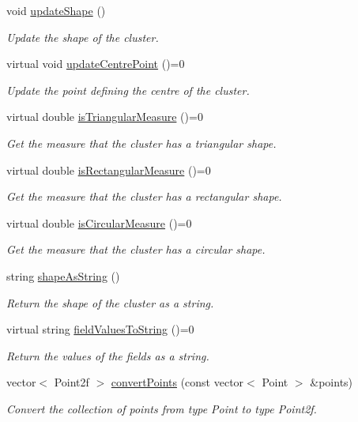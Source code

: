 \begin{DoxyCompactItemize}
void \hyperlink{classmultiscale_1_1analysis_1_1SpatialCollection2D_ab26bc346c1b0b0d17104c7d5cfb170bb}{update\-Shape} ()
\begin{DoxyCompactList}\small\item\em Update the shape of the cluster. \end{DoxyCompactList}\item 
virtual void \hyperlink{classmultiscale_1_1analysis_1_1SpatialCollection2D_aab860163169deb76a7e853df32902ab1}{update\-Centre\-Point} ()=0
\begin{DoxyCompactList}\small\item\em Update the point defining the centre of the cluster. \end{DoxyCompactList}\item 
virtual double \hyperlink{classmultiscale_1_1analysis_1_1SpatialCollection2D_acce0e9ddd2d92e3ba843c3015352cab5}{is\-Triangular\-Measure} ()=0
\begin{DoxyCompactList}\small\item\em Get the measure that the cluster has a triangular shape. \end{DoxyCompactList}\item 
virtual double \hyperlink{classmultiscale_1_1analysis_1_1SpatialCollection2D_a1acb28a7aafd1f75c23a94dbc988b038}{is\-Rectangular\-Measure} ()=0
\begin{DoxyCompactList}\small\item\em Get the measure that the cluster has a rectangular shape. \end{DoxyCompactList}\item 
virtual double \hyperlink{classmultiscale_1_1analysis_1_1SpatialCollection2D_a5d9967a9c531f3abe0236fbef1b0faba}{is\-Circular\-Measure} ()=0
\begin{DoxyCompactList}\small\item\em Get the measure that the cluster has a circular shape. \end{DoxyCompactList}\item 
string \hyperlink{classmultiscale_1_1analysis_1_1SpatialCollection2D_ac18243f267c777ab26bb836097a78c74}{shape\-As\-String} ()
\begin{DoxyCompactList}\small\item\em Return the shape of the cluster as a string. \end{DoxyCompactList}\item 
virtual string \hyperlink{classmultiscale_1_1analysis_1_1SpatialCollection2D_a1b70b9e25f8b82ac2195f75f89280800}{field\-Values\-To\-String} ()=0
\begin{DoxyCompactList}\small\item\em Return the values of the fields as a string. \end{DoxyCompactList}\item 
vector$<$ Point2f $>$ \hyperlink{classmultiscale_1_1analysis_1_1SpatialCollection2D_ad3d11af329d5efa9bddf40b4573ebb2c}{convert\-Points} (const vector$<$ Point $>$ \&points)
\begin{DoxyCompactList}\small\item\em Convert the collection of points from type Point to type Point2f. \end{DoxyCompactList}\end{DoxyCompactItemize}
